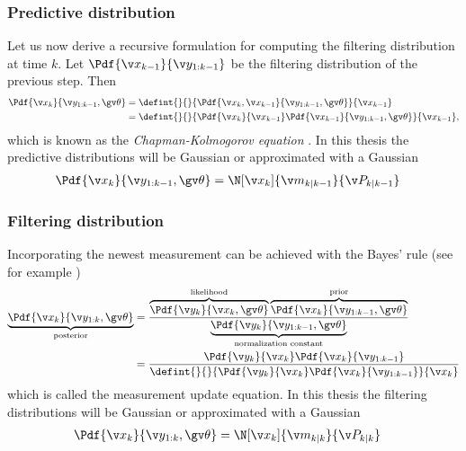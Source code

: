 \subsubsection*{Predictive distribution}
Let us now derive a recursive formulation for computing the filtering distribution at time $k$. Let $\Pdf{\xkk}{\y_{1:k-1}}$
be the filtering distribution of the previous step. Then 
\begin{align}
	\Pdf{\xk}{\y_{1:k-1},\Th}&=\defint{}{}{\Pdf{\xk,\xkk}{\y_{1:k-1},\Th}}{\xkk} \nonumber\\
	&=\defint{}{}{\Pdf{\xk}{\xkk}\Pdf{\xkk}{\y_{1:k-1},\Th}}{\xkk},
	\label{eq:pred_bayes}
\end{align}
which is known as the \emph{Chapman-Kolmogorov equation} \parencite{Sarkka2006}.
In this thesis the predictive distributions will be Gaussian or approximated with a Gaussian
\begin{align}
	\Pdf{\xk}{\y_{1:k-1},\Th}&=\N[\xk]{\m_{k|k-1}}{\P_{k|k-1}}
\end{align}

\subsubsection*{Filtering distribution}
Incorporating the newest measurement can be achieved with the Bayes'
rule (see for example \cite{gelman2004})
\begin{align}
	\underbrace{\Pdf{\xk}{\y_{1:k},\Th}}_\text{posterior}&=\frac{\overbrace{\Pdf{\yk}{\xk,\Th}}^\text{likelihood}\overbrace{\Pdf{\xk}{\y_{1:k-1},\Th}}^\text{prior}}{\underbrace{\Pdf{\y_{k}}{\y_{1:k-1},\Th}}_\text{normalization
	constant}}\nonumber\\
	&=\frac{\Pdf{\yk}{\xk}\Pdf{\xk}{\y_{1:k-1}}}{\defint{}{}{\Pdf{\yk}{\xk}\Pdf{\xk}{\y_{1:k-1}}}{\xk}}
	\label{eq:filt_bayes}
\end{align}
which is called the measurement update equation.
In this thesis the filtering distributions will be Gaussian or approximated with a Gaussian
\begin{align}
	\Pdf{\xk}{\y_{1:k},\Th}&=\N[\xk]{\m_{k|k}}{\P_{k|k}}
\end{align}


